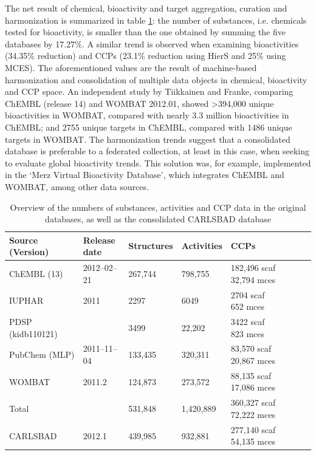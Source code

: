 The net result of chemical, bioactivity and target aggregation, curation and harmonization is summarized in table \ref{tab:cb_02}: the number of substances, i.e. chemicals tested for bioactivity, is smaller than the one obtained by summing the five databases by 17.27\%. A similar trend is observed when examining bioactivities (34.35\% reduction) and CCPs (23.1\% reduction using HierS and 25\% using MCES). The aforementioned values are the result of machine-based harmonization and consolidation of multiple data objects in chemical, bioactivity and CCP space. An independent study by Tiikkainen and Franke\cite{Tiikkainen2013-md,UniProt_Consortium2018-kq}, comparing ChEMBL (release 14) and WOMBAT 2012.01, showed \textgreater 394,000 unique bioactivities in WOMBAT, compared with nearly 3.3 million bioactivities in ChEMBL; and 2755 unique targets in ChEMBL, compared with 1486 unique targets in WOMBAT. The harmonization trends suggest that a consolidated database is preferable to a federated collection, at least in this case, when seeking to evaluate global bioactivity trends. This solution was, for example, implemented in the ‘Merz Virtual Bioactivity Database’, which integrates ChEMBL and WOMBAT, among other data sources.

\begin{table}[]
\caption{Overview of the numbers of substances, activities and CCP data in the original databases, as well as the consolidated CARLSBAD database}
\label{tab:cb_02}
\centering
\begin{tabular}{p{0.25\linewidth}p{0.15\linewidth}p{0.15\linewidth}p{0.15\linewidth}p{0.30\linewidth}}
\hline
\textbf{Source (Version)} & \textbf{Release date} & \textbf{Structures} & \textbf{Activities} & \textbf{CCPs} \\
\hline
ChEMBL (13) & 2012–02–21 & 267,744 & 798,755 & \makecell[l]{182,496 scaf \\ 32,794 mces} \\
IUPHAR & 2011 & 2297 & 6049 & \makecell[l]{2704 scaf \\ 652 mces} \\
PDSP (kidb110121) & & 3499 & 22,202 & \makecell[l]{3422 scaf \\ 823 mces} \\
PubChem (MLP) & 2011–11–04 & 133,435 & 320,311 & \makecell[l]{83,570 scaf \\ 20,867 mces} \\
WOMBAT & 2011.2 & 124,873  & 273,572 & \makecell[l]{88,135 scaf \\ 17,086 mces} \\
Total & & 531,848 & 1,420,889 & \makecell[l]{360,327 scaf \\ 72,222 mces} \\
CARLSBAD & 2012.1 & 439,985 & 932,881 & \makecell[l]{277,140 scaf \\ 54,135 mces} \\
\hline
\end{tabular}
\end{table}

